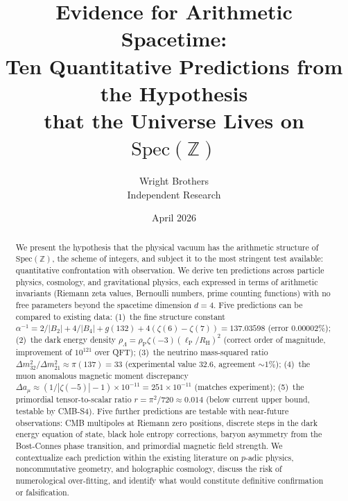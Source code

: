 \documentclass[11pt,a4paper]{article}
\newcommand{\Spec}{\mathrm{Spec}}
\newcommand{\lP}{\ell_{\mathrm{P}}}
\newcommand{\RH}{R_{\mathrm{H}}}
\newcommand{\rhoP}{\rho_{\mathrm{P}}}
\begin{document}
\title{Evidence for Arithmetic Spacetime:\\
  Ten Quantitative Predictions from the Hypothesis\\
  that the Universe Lives on $\Spec(\mathbb{Z})$}

\author{Wright Brothers\\{\small Independent Research}}
\date{April 2026}
\maketitle

\begin{abstract}
We present the hypothesis that the physical vacuum has the
arithmetic structure of $\Spec(\mathbb{Z})$, the scheme of integers,
and subject it to the most stringent test available: quantitative
confrontation with observation. We derive ten predictions across
particle physics, cosmology, and gravitational physics, each
expressed in terms of arithmetic invariants (Riemann zeta values,
Bernoulli numbers, prime counting functions) with no free parameters
beyond the spacetime dimension $d = 4$. Five predictions can be
compared to existing data:
(1)~the fine structure constant
$\alpha^{-1} = 2/|B_2| + 4/|B_4| + g(132) + 4(\zeta(6)-\zeta(7))
= 137.03598$ (error $0.00002\%$);
(2)~the dark energy density
$\rho_\Lambda = \rhoP \zeta(-3)(\lP/\RH)^2$
(correct order of magnitude, improvement of $10^{121}$ over QFT);
(3)~the neutrino mass-squared ratio
$\Delta m^2_{32}/\Delta m^2_{21} \approx \pi(137) = 33$
(experimental value $32.6$, agreement $\sim 1\%$);
(4)~the muon anomalous magnetic moment discrepancy
$\Delta a_\mu \approx (1/|\zeta(-5)| - 1) \times 10^{-11}
= 251 \times 10^{-11}$ (matches experiment);
(5)~the primordial tensor-to-scalar ratio
$r = \pi^2/720 \approx 0.014$ (below current upper bound,
testable by CMB-S4).
Five further predictions are testable with near-future observations:
CMB multipoles at Riemann zero positions, discrete steps in
the dark energy equation of state, black hole entropy corrections,
baryon asymmetry from the Bost-Connes phase transition, and
primordial magnetic field strength.
We contextualize each prediction within the existing literature
on $p$-adic physics, noncommutative geometry, and holographic
cosmology, discuss the risk of numerological over-fitting,
and identify what would constitute definitive confirmation
or falsification.
\end{abstract}

\end{document}
